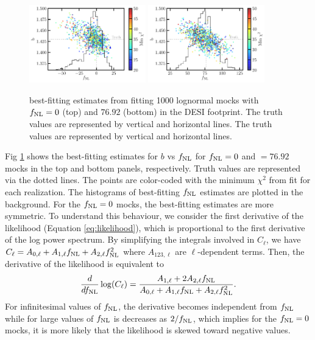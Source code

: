 \begin{figure}
    \centering
    \includegraphics[width=0.45\textwidth]{figures/bestfit_zero.pdf} 
    \includegraphics[width=0.45\textwidth]{figures/bestfit_po100.pdf}         
    \caption{best-fitting estimates from fitting 1000 lognormal mocks with $f_{\rm NL}=0$ (top) and $76.92$ (bottom) in the DESI footprint. The truth values are represented by vertical and horizontal lines. The truth values are represented by vertical and horizontal lines.}\label{fig:bestfit_mocks}
\end{figure}


Fig \ref{fig:bestfit_mocks} shows the best-fitting estimates for $b$ vs $f_{\rm NL}$ for $f_{\rm NL}=0$ and $=76.92$ mocks in the top and bottom panels, respectively. Truth values are represented via the dotted lines. The points are color-coded with the minimum $\chi^{2}$ from fit for each realization. The histograms of best-fitting $f_{\rm NL}$ estimates are plotted in the background. For the $f_{\rm NL}=0$ mocks, the best-fitting estimates are more symmetric. To understand this behaviour, we consider the first derivative of the likelihood (Equation \ref{eq:likelihood}), which is proportional to the first derivative of the log power spectrum. By simplifying the integrals involved in $C_{\ell}$, we have $C_{\ell} = A_{0, \ell} + A_{1,\ell} f_{\rm NL} + A_{2, \ell} f_{\rm NL}^{2}$ where $A_{123,\ell}$ are $\ell$-dependent terms. Then, the derivative of the likelihood is equivalent to
\begin{equation}
    \frac{d}{df_{\rm NL}}\log(C_{\ell}) = \frac{A_{1, \ell}+2A_{2, \ell}f_{\rm NL}}{A_{0, \ell} + A_{1,\ell} f_{\rm NL} + A_{2, \ell} f_{\rm NL}^{2}}.
\end{equation}
For infinitesimal values of $f_{\rm NL}$, the derivative becomes independent from $f_{\rm NL}$ while for large values of $f_{\rm NL}$ is decreases as $2/f_{\rm NL}$, which implies for the $f_{\rm NL}=0$ mocks, it is more likely that the likelihood is skewed toward negative values.






